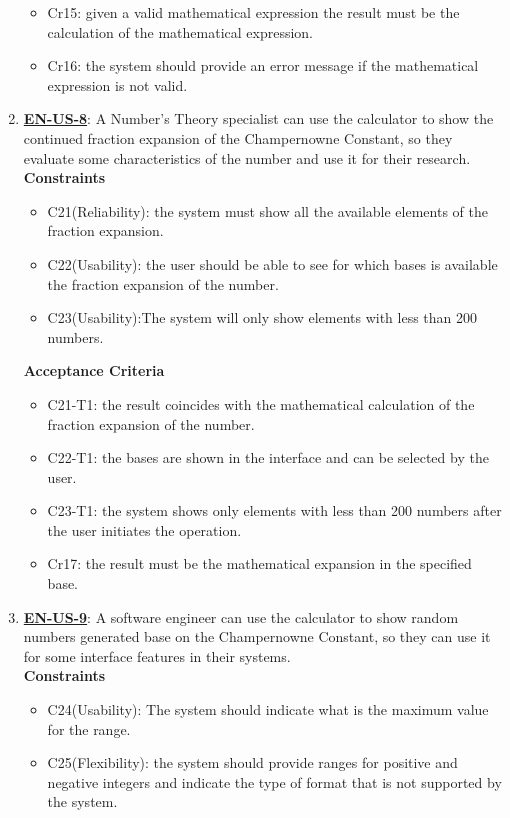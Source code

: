 \documentclass{report}
\begin{document}
\begin{enumerate}
\begin{itemize}
    \item Cr15: given a valid mathematical expression the result must be the calculation of the mathematical expression.
    \item Cr16: the system should provide an error message if the mathematical expression is not valid. \newline
\end{itemize}

\item \underline{\textbf{EN-US-8}}: A Number's Theory specialist can use the calculator to show the continued fraction expansion of the Champernowne Constant, so they evaluate some characteristics of the number and use it for their research. \\ \newline
\textbf{Constraints}
\begin{itemize}
    \item C21(Reliability): the system must show all the available elements of the fraction expansion.  
    \item C22(Usability): the user should be able to see for which bases is available the fraction expansion of the number. 
    \item C23(Usability):The system will only show elements with less than 200 numbers.
\end{itemize}

\textbf{Acceptance Criteria}
\begin{itemize}
    \item C21-T1: the result coincides with the mathematical calculation of the fraction expansion of the number.
    \item C22-T1: the bases are shown in the interface and can be selected by the user.
    \item C23-T1: the system shows only elements with less than 200 numbers after the user initiates the operation.

    \item Cr17: the result must be the mathematical expansion in the specified base.\newline
\end{itemize}

\item \underline{\textbf{EN-US-9}}: A software engineer can use the calculator to show random numbers generated base on the Champernowne Constant, so they can use it for some interface features in their systems. \\ \newline
\textbf{Constraints}
\begin{itemize}
    \item C24(Usability): The system should indicate what is the maximum value for the range. 
    \item C25(Flexibility): the system should provide ranges for positive and negative integers and indicate the type of format that is not supported by the system.
\end{itemize}


\end{enumerate}
\end{document}
